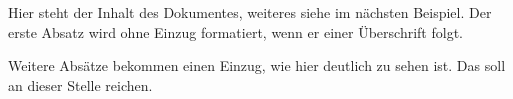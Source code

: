 \documentclass{article}
\begin{document}
  Hier steht der Inhalt des Dokumentes, weiteres siehe im n\"achsten
  Beispiel. Der erste Absatz wird ohne Einzug formatiert, wenn er einer \"Uberschrift folgt.
  
  Weitere Absätze bekommen einen Einzug, wie hier deutlich zu sehen ist.
  Das soll an dieser Stelle reichen.
\end{document}
